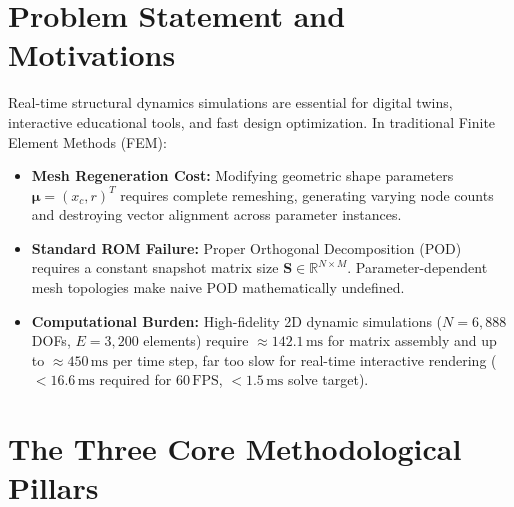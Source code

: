 \documentclass[11pt,a4paper]{article}
\begin{document}
\section{Problem Statement and Motivations}
Real-time structural dynamics simulations are essential for digital twins, interactive educational tools, and fast design optimization. In traditional Finite Element Methods (FEM):
\begin{itemize}[leftmargin=*]
    \item \textbf{Mesh Regeneration Cost:} Modifying geometric shape parameters $\boldsymbol{\mu} = (x_c, r)^T$ requires complete remeshing, generating varying node counts and destroying vector alignment across parameter instances.
    \item \textbf{Standard ROM Failure:} Proper Orthogonal Decomposition (POD) requires a constant snapshot matrix size $\mathbf{S} \in \mathbb{R}^{N \times M}$. Parameter-dependent mesh topologies make naive POD mathematically undefined.
    \item \textbf{Computational Burden:} High-fidelity 2D dynamic simulations ($N = 6,888$ DOFs, $E = 3,200$ elements) require $\approx 142.1\,\text{ms}$ for matrix assembly and up to $\approx 450\,\text{ms}$ per time step, far too slow for real-time interactive rendering ($<16.6\,\text{ms}$ required for $60\,\text{FPS}$, $<1.5\,\text{ms}$ solve target).
\end{itemize}

\section{The Three Core Methodological Pillars}
\end{document}
